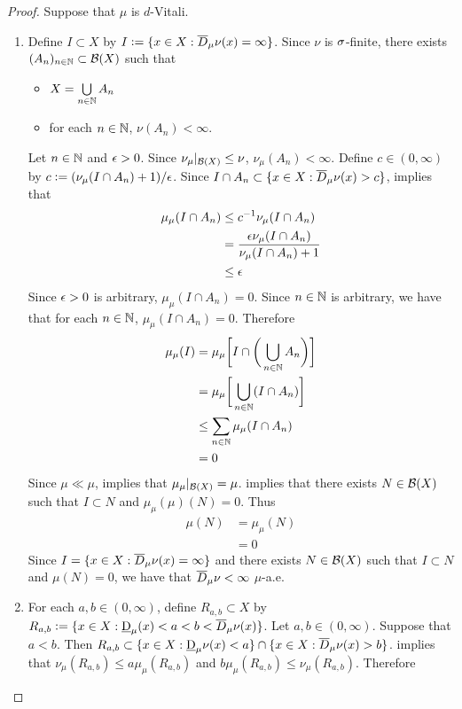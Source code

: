 \documentclass{book}
\begin{document}
	\begin{proof} Suppose that $\mu$ is $d$-Vitali.
		\begin{enumerate}
			\item Define $I \subset X$ by $I \vcentcolon= \{x \in X: \overline{D}_{\mu}\nu(x) = \infty\}$. Since $\nu$ is $\sigma$-finite, there exists $(A_n)_{n \in \mathbb{N}} \subset \mathcal{B}(X)$ such that 
			\begin{itemize}
				\item $X = \bigcup\limits_{n \in \mathbb{N}} A_n$
				\item for each $n \in \mathbb{N}$, $\nu(A_n) < \infty$. 
			\end{itemize}
			Let $n \in \mathbb{N}$ and $\epsilon > 0$. Since $\nu_{\mu}|_{\mathcal{B}(X)} \leq \nu$, $\nu_{\mu}(A_n) < \infty$. Define $c \in (0, \infty)$ by $c \vcentcolon= (\nu_{\mu}(I \cap A_n) + 1) / \epsilon$. Since $I \cap A_n \subset \{x \in X: \overline{D}_{\mu}\nu(x) > c\}$,  implies that 
			\begin{align*}
				 \mu_{\mu}(I\cap A_n) 
				 & \leq c^{-1} \nu_{\mu}(I \cap A_n) \\
				 & = \frac{\epsilon \nu_{\mu}(I \cap A_n)}{\nu_{\mu}(I \cap A_n) + 1} \\
				 & \leq \epsilon 
			\end{align*}
			Since $\epsilon > 0$ is arbitrary, $\mu_{\mu}(I \cap A_n) = 0$. Since $n \in \mathbb{N}$ is arbitrary, we have that for each $n \in \mathbb{N}$, $\mu_{\mu}(I \cap A_n) = 0$. Therefore 
			\begin{align*}
				\mu_{\mu}(I)
				& = \mu_{\mu} \bigg[ I \cap \bigg( \bigcup_{n \in \mathbb{N}} A_n \bigg)  \bigg] \\
				& = \mu_{\mu} \bigg[ \bigcup_{n \in \mathbb{N}} (I \cap A_n)  \bigg] \\
				& \leq \sum_{n \in \mathbb{N}} \mu_{\mu}(I \cap A_n) \\
				& = 0 
			\end{align*}
			Since $\mu \ll \mu$,  implies that $\mu_{\mu}|_{\mathcal{B}(X)} = \mu$.  implies that there exists $N \in \mathcal{B}(X)$ such that $I \subset N$ and $\mu_{\mu}(\mu)(N) = 0$. Thus
			\begin{align*}
				\mu(N)
				& = \mu_{\mu}(N) \\
				& = 0
			\end{align*}
			Since $I = \{x \in X: \overline{D}_{\mu}\nu(x) = \infty \}$ and there exists $N \in \mathcal{B}(X)$ such that $I \subset N$ and $\mu(N) = 0$, we have that $\overline{D}_{\mu}\nu < \infty$ $\mu$-a.e.
			\item For each $a,b \in (0, \infty)$, define $R_{a,b} \subset X$ by $R_{a,b} \vcentcolon= \{x \in X: \underbar{D}_{\mu}(x) < a < b < \overline{D}_{\mu} \nu (x)\}$. Let $a,b \in (0, \infty)$. Suppose that $a < b$. Then $R_{a,b} \subset \{x \in X: \underbar{D}_{\mu}\nu(x) < a\} \cap \{x \in X: \overline{D}_{\mu}\nu(x) > b\}$.  implies that $\nu_{\mu}(R_{a,b}) \leq a \mu_{\mu}(R_{a,b})$ and $b \mu_{\mu}(R_{a,b}) \leq \nu_{\mu}(R_{a,b})$. Therefore 

\end{enumerate}
\end{proof}
\end{document}
